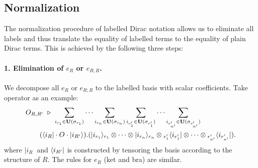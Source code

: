 \subsection{Normalization}
The normalization procedure of labelled Dirac notation allows us to eliminate all labels and thus translate the equality of labelled terms to the equality of plain Dirac terms. This is achieved by the following three steps: 

\paragraph*{1. Elimination of $e_R$ or $e_{R;R}$.}
We decompose all $e_R$ or $e_{R;R}$ to the labelled basis with scalar coefficients. 
Take operator as an example:
\begin{align*}
    & O_{R,R'} \ \triangleright\ \sum_{i_{r_1}\in\mathbf{U}(\sigma_{r_1})}\cdots \sum_{i_{r_n}\in\mathbf{U}(\sigma_{r_n})}
    \sum_{i_{r'_1}\in\mathbf{U}(\sigma_{r'_1})}\cdots \sum_{i_{r'_{n'}}\in\mathbf{U}(\sigma_{r'_{n'}})} \\
    & \qquad (\langle i_R|\cdot O\cdot |i_{R'}\rangle).(|i_{r_1}\rangle_{r_1}\otimes\cdots\otimes|i_{r_n}\rangle_{r_n} \otimes {}_{r'_1}\langle i_{r'_1}|\otimes\cdots\otimes{}_{r'_{n'}}\langle i_{r'_{n'}}|).
\end{align*}
where $|i_R\>$ and $\langle i_{R'}|$ is constructed by tensoring the basis according to the structure of $R$. The rules for $e_R$ (ket and bra) are similar.

